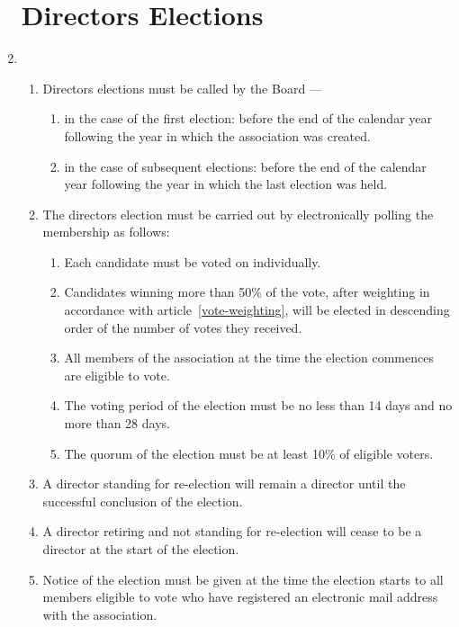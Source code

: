 \begin{enumerate}
\section{Directors Elections}
\item
  \begin{enumerate}
    \item Directors elections must be called by the Board ---
      \begin{enumerate}
        \item in the case of the first election: before the end of the calendar year following
                the year in which the association was created.
        \item in the case of subsequent elections: before the end of the calendar year following
                the year in which the last election was held.
      \end{enumerate}
    \item
      The directors election must be carried out by electronically polling the membership as follows:
      \begin{enumerate}
        \item Each candidate must be voted on individually.
        \item Candidates winning more than 50\% of the vote, after weighting in accordance with
                article~\ref{vote-weighting}, will be elected in descending order of the number
                of votes they received.
        \item All members of the association at the time the election commences are eligible to vote.
        \item The voting period of the election must be no less than 14 days and no more than 28 days.
        \item The quorum of the election must be at least 10\% of eligible voters.
      \end{enumerate}
    \item A director standing for re-election will remain a director until the successful conclusion
          of the election.
    \item A director retiring and not standing for re-election will cease to be a director at the
          start of the election.
    \item Notice of the election must be given at the time the election starts to all members eligible
          to vote who have registered an electronic mail address with the association.
   \end{enumerate}


\end{enumerate}

